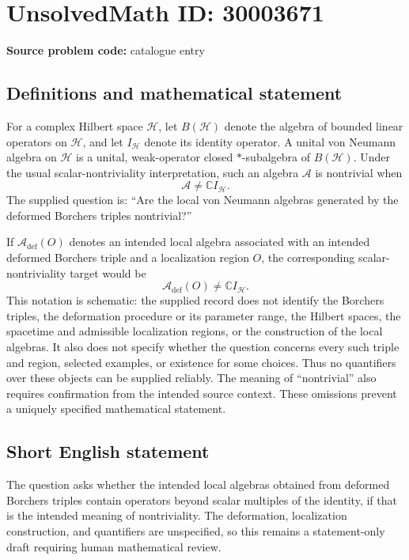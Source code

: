 \documentclass[11pt]{article}
\newcommand{\C}{\mathbb{C}}
\begin{document}
\section*{UnsolvedMath ID: 30003671}
\textbf{Source problem code:} catalogue entry
\subsection{Definitions and mathematical statement}
For a complex Hilbert space \(\mathcal H\), let \(B(\mathcal H)\) denote the algebra of bounded linear operators on \(\mathcal H\), and let \(I_{\mathcal H}\) denote its identity operator. A unital von Neumann algebra on \(\mathcal H\) is a unital, weak-operator closed \(*\)-subalgebra of \(B(\mathcal H)\). Under the usual scalar-nontriviality interpretation, such an algebra \(\mathcal A\) is nontrivial when
\[
\mathcal A\ne\C I_{\mathcal H}.
\]
The supplied question is: ``Are the local von Neumann algebras generated by the deformed Borchers triples nontrivial?''

If \(\mathcal A_{\mathrm{def}}(O)\) denotes an intended local algebra associated with an intended deformed Borchers triple and a localization region \(O\), the corresponding scalar-nontriviality target would be
\[
\mathcal A_{\mathrm{def}}(O)\ne\C I_{\mathcal H}.
\]
This notation is schematic: the supplied record does not identify the Borchers triples, the deformation procedure or its parameter range, the Hilbert spaces, the spacetime and admissible localization regions, or the construction of the local algebras. It also does not specify whether the question concerns every such triple and region, selected examples, or existence for some choices. Thus no quantifiers over these objects can be supplied reliably. The meaning of ``nontrivial'' also requires confirmation from the intended source context. These omissions prevent a uniquely specified mathematical statement.
\subsection{Short English statement}
The question asks whether the intended local algebras obtained from deformed Borchers triples contain operators beyond scalar multiples of the identity, if that is the intended meaning of nontriviality. The deformation, localization construction, and quantifiers are unspecified, so this remains a statement-only draft requiring human mathematical review.
\end{document}

